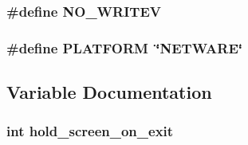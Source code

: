 \subsubsection[{\texorpdfstring{N\+O\+\_\+\+W\+R\+I\+T\+EV}{NO_WRITEV}}]{\setlength{\rightskip}{0pt plus 5cm}\#define N\+O\+\_\+\+W\+R\+I\+T\+EV}\hypertarget{group__APACHE__OS__NETWARE_ga7cb2bc5dd18d959101fbf0fdf47bcbcb}{}\label{group__APACHE__OS__NETWARE_ga7cb2bc5dd18d959101fbf0fdf47bcbcb}
\subsubsection[{\texorpdfstring{P\+L\+A\+T\+F\+O\+RM}{PLATFORM}}]{\setlength{\rightskip}{0pt plus 5cm}\#define P\+L\+A\+T\+F\+O\+RM~\char`\"{}N\+E\+T\+W\+A\+RE\char`\"{}}\hypertarget{group__APACHE__OS__NETWARE_ga1fa4f1561216be34f745f32aaa38d943}{}\label{group__APACHE__OS__NETWARE_ga1fa4f1561216be34f745f32aaa38d943}


\subsection{Variable Documentation}
\subsubsection[{\texorpdfstring{hold\+\_\+screen\+\_\+on\+\_\+exit}{hold_screen_on_exit}}]{ {\bf int} hold\+\_\+screen\+\_\+on\+\_\+exit}\hypertarget{group__APACHE__OS__NETWARE_ga8cb457878fc498ef805d17ebc17c9429}{}\label{group__APACHE__OS__NETWARE_ga8cb457878fc498ef805d17ebc17c9429}
